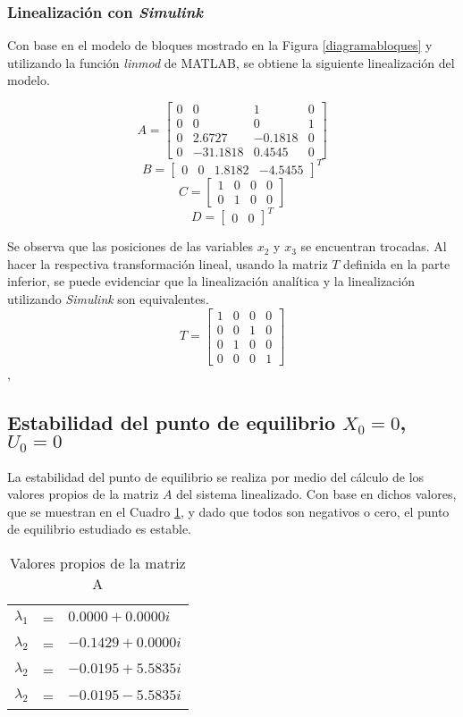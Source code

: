 \documentclass{ieeeaccess}
\begin{document}
\subsubsection{Linealización con \textit{Simulink}}
Con base en el modelo de bloques mostrado en la Figura \ref{diagramabloques} y utilizando la función \textit{linmod} de MATLAB, se obtiene la siguiente linealización del modelo.

\[A =\begin{bmatrix}
    0 & 0 & 1 & 0\\
    0 & 0 & 0 & 1\\
    0 & 2.6727 & -0.1818 & 0\\
    0 & -31.1818 & 0.4545 & 0
\end{bmatrix}
\]
\[B = \begin{bmatrix}
    0 &
    0 &
    1.8182 &
    -4.5455
\end{bmatrix}^{T}\]
\[C = \begin{bmatrix}
    1 & 0 & 0 & 0\\
    0 & 1 & 0 & 0
\end{bmatrix}\]
\[D = \begin{bmatrix}
    0&
    0
\end{bmatrix}^{T}\]

Se observa que las posiciones de las variables $x_2$ y $x_3$ se encuentran trocadas. Al hacer la respectiva transformación lineal, usando la matriz $T$ definida en la parte inferior, se puede evidenciar que la linealización analítica y la linealización utilizando \textit{Simulink} son equivalentes. 
\[T=\begin{bmatrix}
1 & 0 & 0 & 0\\
0 & 0 & 1 & 0\\
0 & 1 & 0 & 0\\
0 & 0 & 0 & 1
\end{bmatrix}\], 

\subsection{Estabilidad del punto de equilibrio $X_0=0$, $U_0=0$}
La estabilidad del punto de equilibrio se realiza por medio del cálculo de los valores propios de la matriz $A$ del sistema linealizado. Con base en dichos valores, que se muestran en el Cuadro \ref{valores propios}, y dado que todos son negativos o cero, el punto de equilibrio estudiado es estable.
\begin{table}
\centering
\label{valores propios}
\caption{Valores propios de la matriz A}
\begin{tabular}{ccl}
$\lambda_1$ & = & $0.0000 + 0.0000i$\\
$\lambda_2$ & = & $-0.1429 + 0.0000i$\\
$\lambda_2$ & = & $-0.0195 + 5.5835i$\\
$\lambda_2$ & = & $-0.0195 - 5.5835i$\\
\end{tabular}
\end{table}
\end{document}
